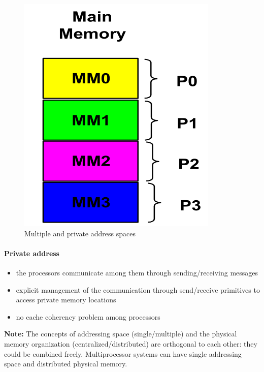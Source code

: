 \begin{figure}[h]
    \centering
    \includegraphics[scale = 0.3]{images/multiple-and-private-address-spaces}
    \caption{Multiple and private address spaces}
    \label{fig:multiple-and-private-address-spaces}
\end{figure}

\paragraph{Private address}
\begin{itemize}
    \item the processors communicate among them through sending/receiving messages
    \item explicit management of the communication through send/receive primitives to access private memory locations
    \item no cache coherency problem among processors
\end{itemize}

\textbf{Note:} The concepts of addressing space
(single/multiple) and the physical memory
organization (centralized/distributed) are
orthogonal to each other: they could be combined freely.
Multiprocessor systems can have single
addressing space and distributed physical
memory.


